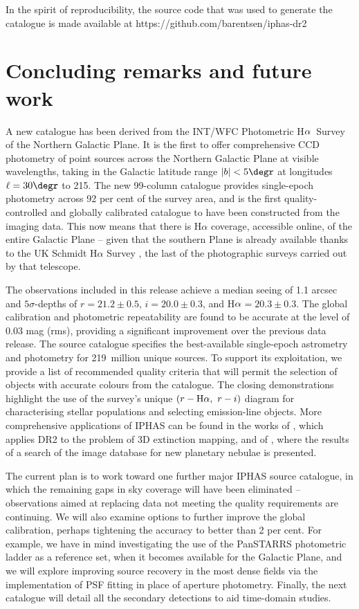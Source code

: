 \documentclass[a4paper,useAMS,usenatbib]{mn2e}
\def\ha{\mbox{H$\rm \alpha$}}
\begin{document}
In the spirit of reproducibility,
the source code that was used to generate
the catalogue is made available at
https://github.com/barentsen/iphas-dr2


\section{Concluding remarks and future work}
\label{sec:conclusions}

A new catalogue has been
derived from the INT/WFC Photometric \ha\ Survey
of the Northern Galactic Plane.
It is the first to offer comprehensive CCD photometry
of point sources across the Northern Galactic Plane at visible wavelengths,
taking in the Galactic latitude range $|b|<5\degr$
at longitudes $\ell=30\degr$ to 215\degr.
The new 99-column catalogue provides single-epoch photometry
across 92 per cent of the survey area,
and is the first quality-controlled and globally calibrated
catalogue to have been constructed from the imaging data.  This
now means that there is H$\alpha$ coverage, accessible online,
of the entire Galactic Plane -- given that the 
southern Plane is already available thanks to the UK
Schmidt H$\alpha$ Survey \citep[SHS,][]{Parker2005}, the last of the 
photographic surveys carried out by that telescope.

The observations included in this release
achieve a median seeing of 1.1 arcsec
and $5\sigma$-depths of $r=21.2\pm 0.5$, $i=20.0\pm 0.3$, and \ha$=20.3\pm 0.3$.
The global calibration and photometric repeatability
are found to be accurate at the level of $0.03$ mag (rms),
providing a significant improvement over the 
previous data release.
The source catalogue specifies the best-available
single-epoch astrometry and photometry
for 219~million unique sources.
To support its exploitation, we provide a list of recommended quality criteria
that will permit the selection of objects with accurate colours from 
the catalogue.  The closing demonstrations highlight the use of the 
survey's unique $(r-\ha,\ r-i)$ diagram for characterising stellar populations
and selecting emission-line objects.  More comprehensive applications of IPHAS
can be found in the works of \citet{Sale2014}, which applies DR2 to the problem
of 3D extinction mapping, and of \citet{Sabin2014}, where the results of a search
of the image database for new planetary nebulae is presented. 

The current plan is to work toward
one further major IPHAS source catalogue,
in which the remaining gaps in sky coverage
will have been eliminated
-- observations aimed at replacing data
not meeting the quality requirements are continuing.
We will also examine options to further improve
the global calibration,
perhaps tightening the accuracy to better than 2 per cent.
For example, we have in mind investigating
the use of the PanSTARRS photometric ladder \citep{Magnier2013}
as a reference set,
when it becomes available for the Galactic Plane, and we will 
explore improving source recovery in 
the most dense fields via the implementation of PSF fitting
in place of aperture photometry.  
Finally, the next catalogue will detail all the secondary detections
to aid time-domain studies.
\end{document}
